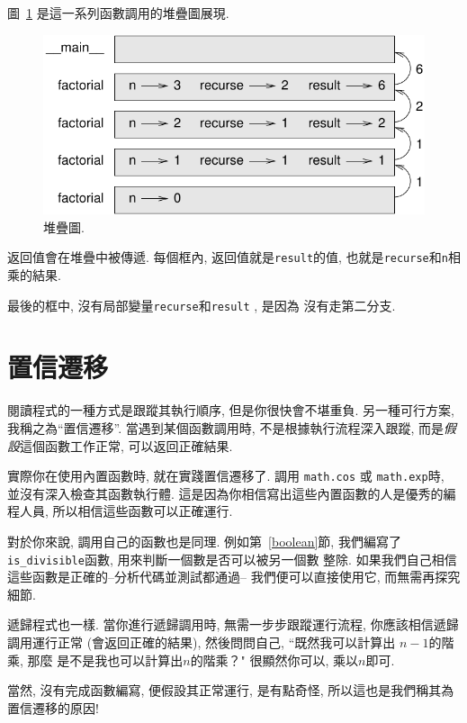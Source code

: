 \documentclass[10pt]{book}
\begin{document}
圖~\ref{fig.stack3} 是這一系列函數調用的堆疊圖展現.

\begin{figure}
\centerline
{\includegraphics[scale=0.8]{figs/stack3.pdf}}
\caption{堆疊圖.}
\label{fig.stack3}
\end{figure}

返回值會在堆疊中被傳遞. 
每個框內, 返回值就是{\tt result}的值, 也就是{\tt recurse}和{\tt n}相乘的結果. 

最後的框中, 沒有局部變量{\tt recurse}和{\tt result} , 是因為
沒有走第二分支. 

\section{置信遷移}

閱讀程式的一種方式是跟蹤其執行順序, 但是你很快會不堪重負. 
另一種可行方案, 我稱之為``置信遷移''. 當遇到某個函數調用時, 
不是根據執行流程深入跟蹤, 
而是{\em 假設}這個函數工作正常, 可以返回正確結果. 

實際你在使用內置函數時, 就在實踐置信遷移了. 調用
{\tt math.cos} 或 {\tt math.exp}時, 並沒有深入檢查其函數執行體. 
這是因為你相信寫出這些內置函數的人是優秀的編程人員, 
所以相信這些函數可以正確運行. 

對於你來說, 調用自己的函數也是同理. 例如第~\ref{boolean}節, 
我們編寫了\verb"is_divisible"函數, 用來判斷一個數是否可以被另一個數
整除. 如果我們自己相信這些函數是正確的--分析代碼並測試都通過--
我們便可以直接使用它, 而無需再探究細節. 

遞歸程式也一樣. 當你進行遞歸調用時, 
無需一步步跟蹤運行流程, 你應該相信遞歸調用運行正常
(會返回正確的結果), 然後問問自己, ``既然我可以計算出 $n-1$的階乘, 那麼
是不是我也可以計算出$n$的階乘？" 很顯然你可以, 乘以$n$即可. 

當然, 沒有完成函數編寫, 便假設其正常運行, 是有點奇怪, 
所以這也是我們稱其為置信遷移的原因!
\end{document}
